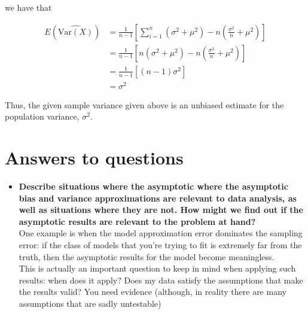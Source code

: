 we have that


\begin{align*}
E(\widehat{\text{Var}(X)}) & = \frac{1}{n-1} \left[\sum_{i=1}^n (\sigma^2 + \mu^2) -  n \left(\frac{\sigma^2}{n} + \mu^2 \right) \right]\\
& = \frac{1}{n-1} \left[ n(\sigma^2 + \mu^2) -  n \left(\frac{\sigma^2}{n} + \mu^2 \right) \right]\\
& = \frac{1}{n-1} \left[ (n-1)\sigma^2 \right]\\
& = \sigma^2
\end{align*}


Thus, the given sample variance given above is an unbiased estimate for the population variance, $\sigma^2$.




\section{Answers to questions}


\begin{itemize}
\item \textbf{Describe situations where the asymptotic where the asymptotic bias and variance approximations are relevant to data analysis, as well as situations where they are not. How might we find out if the asymptotic results are relevant to the problem at hand?}\\
One example is when the model approximation error dominates the sampling error: if the class of models that you're trying to fit is extremely far from the truth, then the asymptotic results for the model become meaningless.\\
This is actually an important question to keep in mind when applying such results: when does it apply? Does my data satisfy the assumptions that make the results valid? You need evidence (although, in reality there are many assumptions that are sadly untestable)
\end{itemize}


